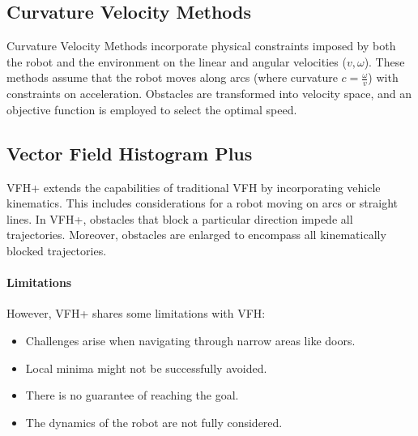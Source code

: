 \subsection{Curvature Velocity Methods}
Curvature Velocity Methods incorporate physical constraints imposed by both the robot and the environment on the linear and angular velocities ($v,\omega$). 
These methods assume that the robot moves along arcs (where curvature $c=\frac{\omega}{v}$) with constraints on acceleration. 
Obstacles are transformed into velocity space, and an objective function is employed to select the optimal speed.

\subsection{Vector Field Histogram Plus}
VFH+ extends the capabilities of traditional VFH by incorporating vehicle kinematics. 
This includes considerations for a robot moving on arcs or straight lines. 
In VFH+, obstacles that block a particular direction impede all trajectories. 
Moreover, obstacles are enlarged to encompass all kinematically blocked trajectories.

\paragraph*{Limitations}
However, VFH+ shares some limitations with VFH:
\begin{itemize}
    \item Challenges arise when navigating through narrow areas like doors.
    \item Local minima might not be successfully avoided.
    \item There is no guarantee of reaching the goal.
    \item The dynamics of the robot are not fully considered.
\end{itemize}


